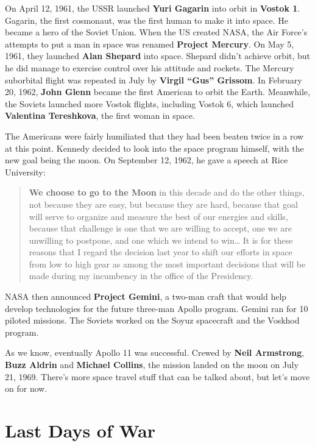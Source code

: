 On April 12, 1961, the USSR launched \textbf{Yuri Gagarin} into orbit in \textbf{Vostok 1}.
Gagarin, the first cosmonaut, was the first human to make it into space.
He became a hero of the Soviet Union.
When the US created NASA,
the Air Force's attempts to put a man in space was renamed \textbf{Project Mercury}.
On May 5, 1961, they launched \textbf{Alan Shepard} into space.
Shepard didn't achieve orbit, but he did manage to exercise control over his attitude and rockets.
The Mercury suborbital flight was repeated in July by \textbf{Virgil ``Gus'' Grissom}.
In February 20, 1962, \textbf{John Glenn} became the first American to orbit the Earth.
Meanwhile, the Soviets launched more Vostok flights, including Vostok 6,
which launched \textbf{Valentina Tereshkova}, the first woman in space.

The Americans were fairly humiliated that they had been beaten twice in a row at this point.
Kennedy decided to look into the space program himself, with the new goal being the moon.
On September 12, 1962, he gave a speech at Rice University:
\begin{quote}
  \textbf{We choose to go to the Moon} in this decade and do the other things,
  not because they are easy, but because they are hard,
  because that goal will serve to organize and measure the best of our energies and skills,
  because that challenge is one that we are willing to accept,
  one we are unwilling to postpone, and one which we intend to win\dots{}
  It is for these reasons that I regard the decision last year
  to shift our efforts in space from low to high gear
  as among the most important decisions that will be made during my incumbency
  in the office of the Presidency.
\end{quote}

NASA then announced \textbf{Project Gemini},
a two-man craft that would help develop technologies for the future three-man Apollo program.
Gemini ran for 10 piloted missions.
The Soviets worked on the Soyuz spacecraft and the Voskhod program.

As we know, eventually Apollo 11 was successful.
Crewed by \textbf{Neil Armstrong}, \textbf{Buzz Aldrin} and \textbf{Michael Collins},
the mission landed on the moon on July 21, 1969.
There's more space travel stuff that can be talked about, but let's move on for now.

\section{Last Days of War}

